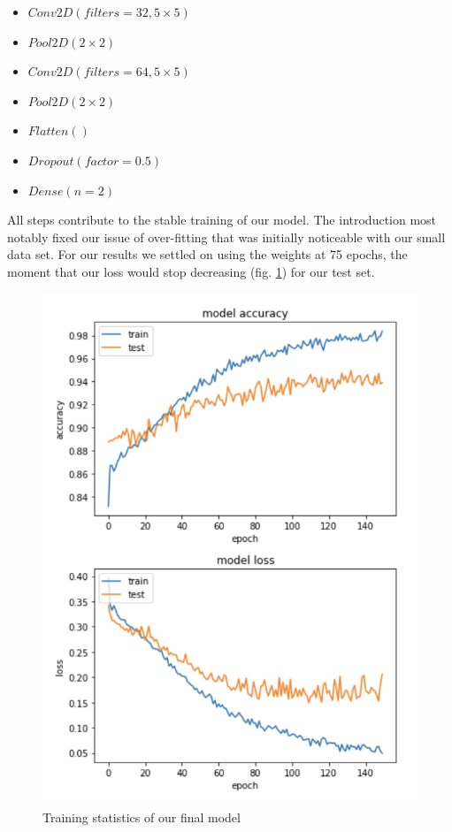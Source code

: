 \begin{itemize}
    \item $Conv2D(filters=32, 5\times5)$
    \item $Pool2D(2\times2)$
    \item $Conv2D(filters=64, 5\times5)$
    \item $Pool2D(2\times2)$
    \item $Flatten()$
    \item $Dropout(factor=0.5)$
    \item $Dense(n=2)$
\end{itemize}

All steps contribute to the stable training of our model. The introduction most notably fixed our issue of over-fitting that was initially noticeable with our small data set. For our results we settled on using the weights at 75 epochs, the moment that our loss would stop decreasing (fig. \ref{cnn-final}) for our test set. 

\begin{figure}[ht]
\begin{center}
\centerline{\includegraphics[width=\columnwidth]{images/cnn-training-final.png}}
\caption{Training statistics of our final model}
\label{cnn-final}
\end{center}
\end{figure}

